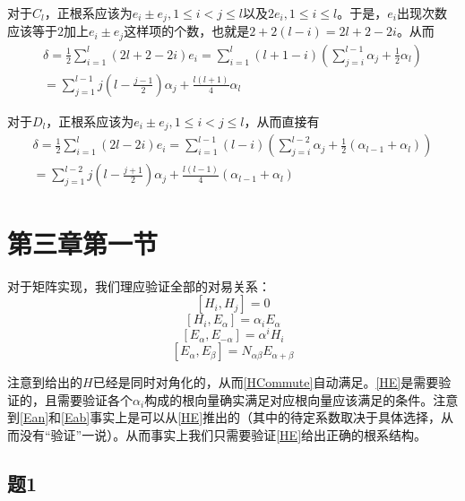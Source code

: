 \documentclass{ctexart}
\begin{document}
	对于$C_l$，正根系应该为$e_i\pm e_j,1\leq i<j\leq l$以及$2e_i,1\leq i\leq l$。于是，$e_i$出现次数应该等于$2$加上$e_i\pm e_j$这样项的个数，也就是$2+2(l-i)=2l+2-2i$。从而
	\begin{multline}
	\delta=\frac{1}{2}\sum_{i=1}^l (2l+2-2i)e_i=\sum_{i=1}^l\left(l+1-i\right)\left(\sum_{j=i}^{l-1} \alpha_j+\frac{1}{2}\alpha_l\right)\\=\sum_{j=1}^{l-1}j\left(l-\frac{j-1}{2}\right)\alpha_j+\frac{l(l+1)}{4}\alpha_l
	\end{multline}
	
	对于$D_l$，正根系应该为$e_i\pm e_j,1\leq i<j\leq l$，从而直接有
	\begin{multline}
	\delta=\frac{1}{2}\sum_{i=1}^l (2l-2i)e_i=\sum_{i=1}^{l-1}\left(l-i\right)\left(\sum_{j=i}^{l-2} \alpha_j+\frac{1}{2}\left(\alpha_{l-1}+\alpha_l\right)\right)\\=\sum_{j=1}^{l-2}j\left(l-\frac{j+1}{2}\right)\alpha_j+\frac{l(l-1)}{4}(\alpha_{l-1}+\alpha_l)
	\end{multline}
	
	\section{第三章第一节}
	
	对于矩阵实现，我们理应验证全部的对易关系：
	\begin{equation}\label{HCommute}
	[H_i,H_j]=0
	\end{equation}
	\begin{equation}\label{HE}
	[H_i,E_\alpha]=\alpha_iE_\alpha
	\end{equation}
	\begin{equation}\label{Ean}
	[E_\alpha,E_{-\alpha}]=\alpha^iH_i
	\end{equation}
	\begin{equation}\label{Eab}
	[E_\alpha,E_\beta]=N_{\alpha\beta}E_{\alpha+\beta}
	\end{equation}
	
	注意到给出的$H$已经是同时对角化的，从而\eqref{HCommute}自动满足。\eqref{HE}是需要验证的，且需要验证各个$\alpha_i$构成的根向量确实满足对应根向量应该满足的条件。注意到\eqref{Ean}和\eqref{Eab}事实上是可以从\eqref{HE}推出的（其中的待定系数取决于具体选择，从而没有“验证”一说）。从而事实上我们只需要验证\eqref{HE}给出正确的根系结构。
	
	\subsection{题1}
	
\end{document}
